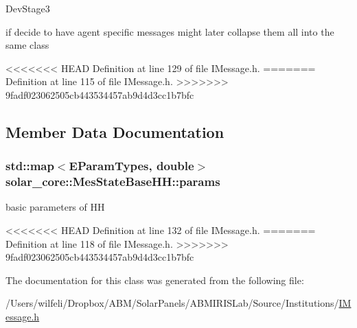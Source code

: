 \begin{DoxyRefDesc}{Dev\+Stage3}
\item[\hyperlink{_dev_stage3__DevStage3000004}{Dev\+Stage3}]if decide to have agent specific messages might later collapse them all into the same class\end{DoxyRefDesc}


<<<<<<< HEAD
Definition at line 129 of file I\+Message.\+h.
=======
Definition at line 115 of file I\+Message.\+h.
>>>>>>> 9fadf023062505cb443534457ab9d4d3cc1b7bfc



\subsection{Member Data Documentation}
\hypertarget{classsolar__core_1_1_mes_state_base_h_h_a75575469dfbf7a86bd1ea95fb85c5194}{}
\subsubsection[{params}]{\setlength{\rightskip}{0pt plus 5cm}std\+::map$<${\bf E\+Param\+Types}, double$>$ solar\+\_\+core\+::\+Mes\+State\+Base\+H\+H\+::params}\label{classsolar__core_1_1_mes_state_base_h_h_a75575469dfbf7a86bd1ea95fb85c5194}
basic parameters of H\+H 

<<<<<<< HEAD
Definition at line 132 of file I\+Message.\+h.
=======
Definition at line 118 of file I\+Message.\+h.
>>>>>>> 9fadf023062505cb443534457ab9d4d3cc1b7bfc



The documentation for this class was generated from the following file\+:\begin{DoxyCompactItemize}
\item 
/\+Users/wilfeli/\+Dropbox/\+A\+B\+M/\+Solar\+Panels/\+A\+B\+M\+I\+R\+I\+S\+Lab/\+Source/\+Institutions/\hyperlink{_i_message_8h}{I\+Message.\+h}\end{DoxyCompactItemize}

